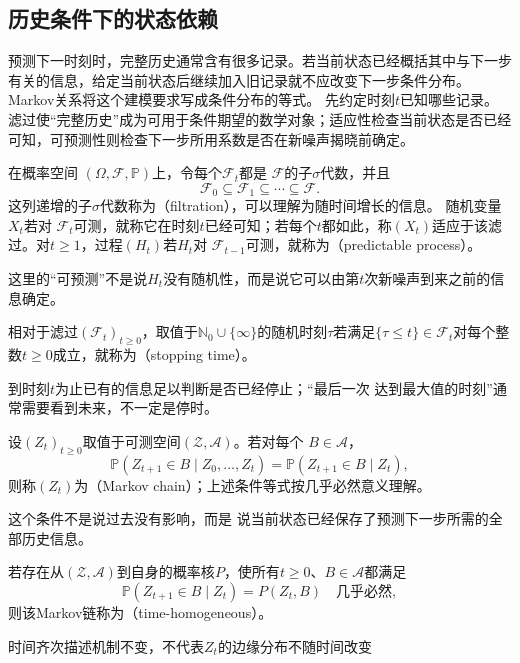 \subsection{历史条件下的状态依赖}

预测下一时刻时，完整历史通常含有很多记录。若当前状态已经概括其中与下一步有关的信息，给定当前状态后继续加入旧记录就不应改变下一步条件分布。Markov关系将这个建模要求写成条件分布的等式。
\label{sec:rv-markov}
\label{sec:stoch-martingales-stopping-sequential-concentration}
先约定时刻\(t\)已知哪些记录。滤过使“完整历史”成为可用于条件期望的数学对象；适应性检查当前状态是否已经可知，可预测性则检查下一步所用系数是否在新噪声揭晓前确定。
\begin{definition}[滤过、适应与可预测性]
  \label{def:stoch-filtration-adaptation-predictability}
在概率空间
$(\Omega,\mathcal{F},\mathbb{P})$上，令每个$\mathcal{F}_t$都是
$\mathcal{F}$的子$\sigma$代数，并且
\[
  \mathcal{F}_0\subseteq\mathcal{F}_1\subseteq\cdots\subseteq\mathcal{F}.
\]
这列递增的子$\sigma$代数称为（filtration），可以理解为随时间增长的信息。
随机变量$X_t$若对
$\mathcal{F}_t$可测，就称它在时刻$t$已经可知；若每个$t$都如此，称$(X_t)$适应于该滤过。对$t\geq1$，过程$(H_t)$若$H_t$对
$\mathcal{F}_{t-1}$可测，就称为（predictable process）。
\end{definition}
这里的“可预测”不是说$H_t$没有随机性，而是说它可以由第$t$次新噪声到来之前的信息确定。
\begin{definition}[停时]
  \label{def:stoch-stopping-time}
  相对于滤过\((\mathcal F_t)_{t\geq0}\)，取值于\(\mathbb N_0\cup\{\infty\}\)的随机时刻$\tau$若满足$\{\tau\leq t\}\in\mathcal{F}_t$对每个整数$t\geq0$成立，就称为（stopping time）。
\end{definition}
到时刻$t$为止已有的信息足以判断是否已经停止；“最后一次
达到最大值的时刻”通常需要看到未来，不一定是停时。


\begin{definition}[Markov链]
  \label{def:stoch-markov-chain}
设$(Z_t)_{t\geq0}$取值于可测空间$(\mathcal{Z},\mathcal{A})$。若对每个
$B\in\mathcal{A}$，
\[
  \mathbb{P}(Z_{t+1}\in B\mid Z_0,\ldots,Z_t)
  =
  \mathbb{P}(Z_{t+1}\in B\mid Z_t),
\]
则称$(Z_t)$为（Markov chain）；上述条件等式按几乎必然意义理解。
\end{definition}
这个条件不是说过去没有影响，而是
说当前状态已经保存了预测下一步所需的全部历史信息。
\begin{definition}[时间齐次Markov链]
  \label{def:stoch-time-homogeneous-chain}
  若存在从\((\mathcal Z,\mathcal A)\)到自身的概率核\(P\)，使所有\(t\geq0\)、\(B\in\mathcal A\)都满足
  \[ \mathbb P(Z_{t+1}\in B\mid Z_t)=P(Z_t,B)\quad\text{几乎必然}, \]
  则该Markov链称为（time-homogeneous）。
\end{definition}
时间齐次描述机制不变，不代表$Z_t$的边缘分布不随时间改变

